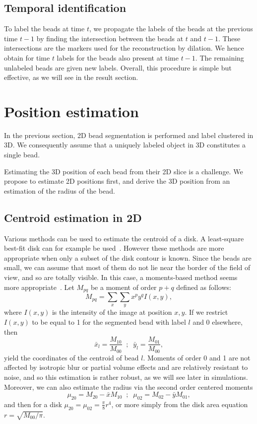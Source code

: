 \documentclass{llncs}
\begin{document}
\subsection{Temporal identification}

To label the beads at time $t$, we propagate the labels of the beads at the previous time $t-1$ by finding the intersection between the beads at $t$ and $t-1$. These intersections are the markers used for the reconstruction by dilation. We hence obtain for time $t$ labels for the beads also present at time $t-1$. The remaining unlabeled beads are given new labels. Overall, this procedure is simple but effective, as we will see in the result section.

\section{Position estimation}
In the previous section, 2D bead segmentation is performed and label clustered in 3D. We consequently assume that a uniquely labeled object in 3D constitutes a single bead.

Estimating the 3D position of each bead from their 2D slice is a challenge. We propose to estimate 2D positions first, and derive the 3D position from an estimation of the radius of the bead.

\subsection{Centroid estimation in 2D}
Various methods can be used to estimate the centroid of a disk. A least-square best-fit disk can for example be used~\cite{gander1994least,fitzgibbon1999direct}. However these methods are more appropriate when only a subset of the disk contour is known. Since the beads are small, we can assume that most of them do not lie near the border of the field of view, and so are totally visible. In this case, a moments-based method seems more appropriate~\cite{hu1962visual}. Let $M_{pq}$ be a moment of order $p+q$ defined as follows:
\begin{equation}
M_{pq} = \sum_x\sum_y x^p y^q I(x,y),
\end{equation}
where $I(x,y)$ is the intensity of the image at position $x,y$. If we restrict $I(x,y)$ to be equal to 1 for the segmented bead with label $l$ and 0 elsewhere, then 
\begin{equation}
\bar{x}_l = \frac{M_{10}}{M_{00}} \;\;;\;\; \bar{y}_l = \frac{M_{01}}{M_{00}},
\end{equation}
yield the coordinates of the centroid of bead $l$. Moments of order 0 and 1 are not affected by isotropic blur or partial volume effects and are relatively resistant to noise, and so this estimation is rather robust, as we will see later in simulations. Moreover, we can also estimate the radius via the second order centered moments
\begin{equation}
\mu_{20} = M_{20} - \bar{x}M_{10} \;\;;\;\; \mu_{02} = M_{02} - \bar{y}M_{01},
\end{equation}
and then for a disk $\mu_{20}=\mu_{02} = \frac{\pi}{8}r^4$, or more simply from the disk area equation $r=\sqrt{M_{00}/\pi}$.
\end{document}
